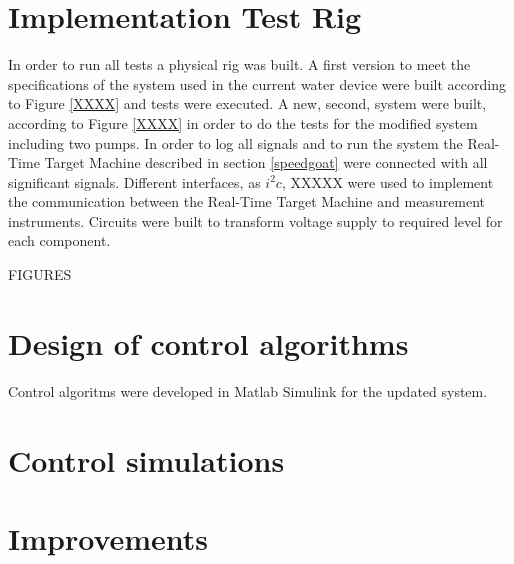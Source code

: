\section{Implementation Test Rig}
In order to run all tests a physical rig was built. A first version to meet the specifications of the system used in the current water device were built according to Figure \ref{XXXX} and tests were executed.
A new, second, system were built, according to Figure \ref{XXXX} in order to do the tests for the modified system including two pumps. In order to log all signals and to run the system the Real-Time Target Machine described in section \ref{speedgoat} were connected with all significant signals.
Different interfaces, as $i^{2}c$, XXXXX were used to implement the communication between the Real-Time Target Machine and measurement instruments. Circuits were built to transform voltage supply to required level for each component. 


FIGURES




\section{Design of control algorithms}
Control algoritms were developed in Matlab Simulink for the updated system. 

\section{Control simulations}





\section{Improvements}

